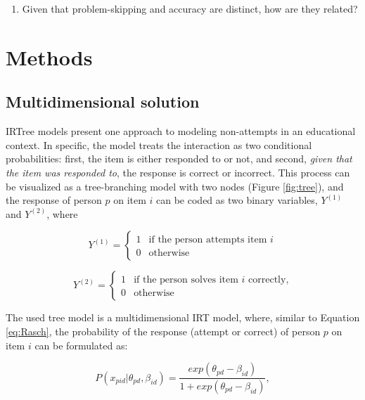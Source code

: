 \documentclass[11pt]{article}
\begin{document}
\begin{enumerate}
    \item[\textbf{2.}] Given that problem-skipping and accuracy are distinct, how are they related? 
\end{enumerate}

\section{Methods}

\subsection{Multidimensional solution}

IRTree models present one approach to modeling non-attempts in an educational context. In specific, the model treats the interaction as two conditional probabilities: first, the item is either responded to or not, and second, \textit{given that the item was responded to}, the response is correct or incorrect. This process can be visualized as a tree-branching model with two nodes (Figure \ref{fig:tree}), and the response of person $p$ on item $i$ can be coded as two binary variables, $Y^{(1)}$ and $Y^{(2)}$, where 

\begin{equation}
Y^{(1)} =
\begin{cases} 
1 & \text{if the person attempts item } i \\
0 & \text{otherwise}
\end{cases}
\end{equation}

\begin{equation}
Y^{(2)} =
\begin{cases} 
1 & \text{if the person solves item } i \text{ correctly,} \\
0 & \text{otherwise}
\end{cases}
\label{eq:cases}
\end{equation}

The used tree model is a multidimensional IRT model, where, similar to Equation \ref{eq:Rasch}, the probability of the response (attempt or correct) of person $p$ on item $i$ can be formulated as: 

\begin{equation}
P(x_{pid}|\theta_{pd}, \beta_{id}) = \frac{exp(\theta_{pd} - \beta_{id})}{1 + exp(\theta_{pd} - \beta_{id})},
\label{eq:tree}
\end{equation}
\end{document}
